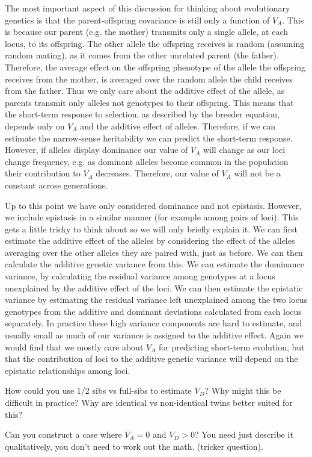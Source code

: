 The most important aspect of this discussion for thinking about
evolutionary genetics is that the parent-offspring covariance is still
only a function of $V_A$. This is because our parent (e.g. the mother) transmits only a
single allele, at each locus, to its offspring. The other allele the
offspring receives is random (assuming random mating), as it comes
from the other unrelated parent (the father). Therefore, the average
effect on the offspring phenotype of
the allele the offspring receives from the mother, is averaged over
the random allele the child receives from the father. Thus we only
care about the additive effect of the allele, as parents transmit only
alleles not genotypes to their offspring. This means that the short-term response
to selection, as described by the breeder equation, depends only on
$V_A$ and the additive effect of alleles. Therefore, if we can
estimate the narrow-sense heritability we can predict the short-term response.
However, if alleles display dominance our value of $V_A$ will change
as our loci change frequency, e.g. as dominant alleles become common
in the population their contribution to $V_A$ decreases. Therefore,
our value of $V_A$ will not be a constant across generations.

Up to this point we have only considered
dominance and not epistasis. However, we include epistasis in a
similar manner (for example among pairs of loci). This gets a little
tricky to think about so we will only briefly explain it. 
 We can first estimate the additive effect of the
alleles by considering the effect of the alleles averaging over the
other alleles they are paired with, just as before. We can then
calculate the additive genetic variance from this. We can estimate
the dominance variance, by calculating the residual variance among
genotypes at a locus unexplained by the additive effect of the
loci. We can then estimate the epistatic variance by estimating the
residual variance left unexplained among the two locus genotypes from the additive and dominant
deviations calculated from each locus separately. In practice these
high variance components are hard to estimate, and usually small as
much of our variance is assigned to the additive effect.  Again we
would find that we mostly care about $V_A$ for predicting short-term
evolution, but that the contribution of loci to the additive genetic
variance will depend on the epistatic relationships among loci.




\begin{question}
How could you use 1/2 sibs vs full-sibs to estimate $V_D$? Why might
this be difficult in practice? Why are identical vs non-identical
twins better suited for this?
\end{question}

\begin{question}
Can you construct a case where $V_A=0$ and $V_D>0$? You need
just describe it qualitatively, you don't need to work out the
math. (tricker question).
\end{question}


\newpage
